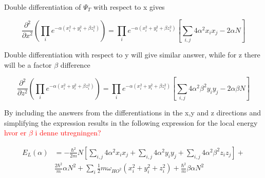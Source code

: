 \documentclass[norsk,a4paper,12pt]{article}
\begin{document}
Double differentiation of $\Psi_T$ with respect to x gives

\begin{equation}
	\frac{\partial^2}{\partial x^2} (\prod_i e^{-\alpha(x_i^2 + y_i^2 + \beta z_i^2)}) = \prod_i e^{-\alpha(x_i^2 + y_i^2 + \beta z_i^2)} [\sum_{i,j} 4 \alpha^2 x_i x_j -2 \alpha N ]
\end{equation}

Double differentiation with respect to y will give similar answer, while for z there will be a factor $\beta$ difference

\begin{equation}
\frac{\partial^2}{\partial z^2} (\prod_i e^{-\alpha(x_i^2 + y_i^2 + \beta z_i^2)}) = \prod_i e^{-\alpha(x_i^2 + y_i^2 + \beta z_i^2)} [\sum_{i,j} 4 \alpha^2 \beta^2 y_i y_j -2 \alpha \beta N ]
\end{equation}

By including the answers from the differentiations in the x,y and z directions and simplifying the expression results in the following expression for the local energy \textcolor{red}{hvor er $\beta$ i denne utregningen?}

\begin{equation}
\begin{aligned}
	E_L(\alpha) & = -\frac{\hbar^2}{2m} N [ \sum_{i,j} 4 \alpha^2 x_i x_j + \sum_{i,j} 4 \alpha^2 y_i y_j + \sum_{i,j} 4 \alpha^2 \beta^2 z_i z_j] +  \\ & \frac{2 \hbar^2}{m}\alpha N^2 + \sum_i \frac{1}{2}m\omega_{HO^2}(x_i^2 + y_i^2 + z_i^2) + \frac{\hbar^2}{m}\beta \alpha N^2
\end{aligned}
\end{equation}
\fi
\end{document}
